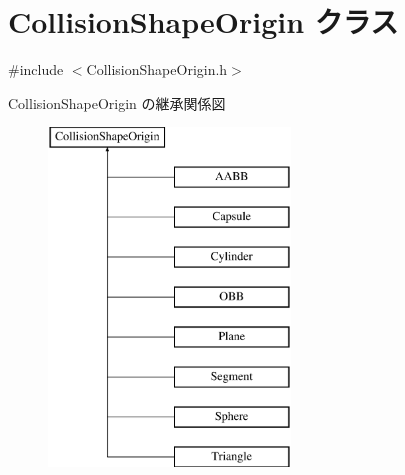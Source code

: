 \hypertarget{class_collision_shape_origin}{}\section{Collision\+Shape\+Origin クラス}
\label{class_collision_shape_origin}


{\ttfamily \#include $<$Collision\+Shape\+Origin.\+h$>$}

Collision\+Shape\+Origin の継承関係図\begin{figure}[H]
\begin{center}
\leavevmode
\includegraphics[height=9.000000cm]{class_collision_shape_origin}
\end{center}
\end{figure}
